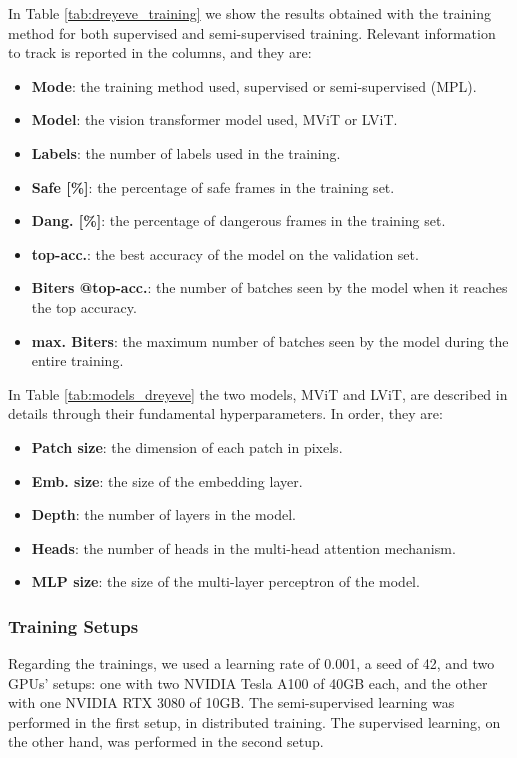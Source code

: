 In Table \ref{tab:dreyeve_training} we show the results obtained with the 
training method for both supervised and semi-supervised training.
Relevant information to track is reported in the columns, and they are:
\begin{itemize}
    \addtolength\itemsep{-2mm}
    \item \textbf{Mode}: the training method used, supervised or semi-supervised
    (MPL).
    \item \textbf{Model}: the vision transformer model used, MViT or LViT.
    \item \textbf{Labels}: the number of labels used in the training.
    \item \textbf{Safe [\%]}: the percentage of safe frames in the training set.
    \item \textbf{Dang. [\%]}: the percentage of dangerous frames in the training set.
    \item \textbf{top-acc.}: the best accuracy of the model on the validation set.
    \item \textbf{Biters @top-acc.}: the number of batches seen by the model when 
    it reaches the top accuracy.
    \item \textbf{max. Biters}: the maximum number of batches seen by the model 
    during the entire training.
\end{itemize}
In Table \ref{tab:models_dreyeve} the two models, MViT and LViT, are described 
in details through their fundamental hyperparameters. In order, they are:
\begin{itemize}
    \addtolength\itemsep{-2mm}
    \item \textbf{Patch size}: the dimension of each patch in pixels.
    \item \textbf{Emb. size}: the size of the embedding layer.
    \item \textbf{Depth}: the number of layers in the model.
    \item \textbf{Heads}: the number of heads in the multi-head attention mechanism.
    \item \textbf{MLP size}: the size of the multi-layer perceptron of the model.
\end{itemize}

\subsubsection{Training Setups}
Regarding the trainings, we used a learning rate of 0.001, a seed of 42, and 
two GPUs' setups: one with two NVIDIA Tesla A100 of 40GB each, and the other with 
one NVIDIA RTX 3080 of 10GB. The semi-supervised learning was performed in the 
first setup, in distributed training. The supervised learning, on the other hand, 
was performed in the second setup. 

